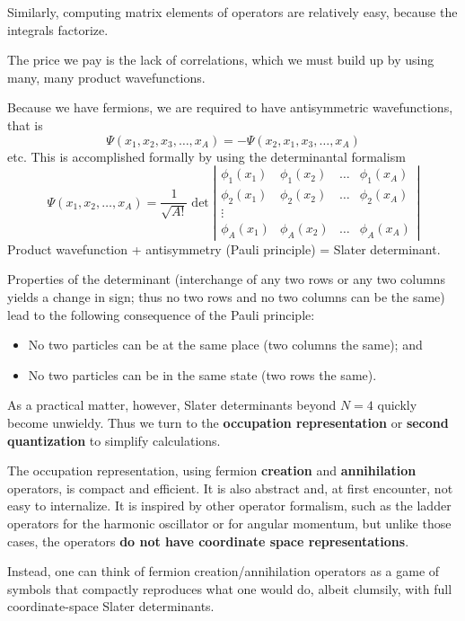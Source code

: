 \documentclass[%
twoside,                 %
final,                   %
10pt]{article}
\begin{document}
Similarly, computing matrix elements of operators are relatively easy, because the 
integrals factorize.


The price we pay is the lack of correlations, which we must build up by using many, many product 
wavefunctions.


Because we have fermions, we are required to have antisymmetric wavefunctions, that is
\[
\Psi(x_1, x_2, x_3, \ldots, x_A) = - \Psi(x_2, x_1, x_3, \ldots, x_A)
\]
etc. This is accomplished formally by using the determinantal formalism
\[
\Psi(x_1, x_2, \ldots, x_A) 
= \frac{1}{\sqrt{A!}} 
\det \left | 
\begin{array}{cccc}
\phi_1(x_1) & \phi_1(x_2) & \ldots & \phi_1(x_A) \\
\phi_2(x_1) & \phi_2(x_2) & \ldots & \phi_2(x_A) \\
 \vdots & & &  \\
\phi_A(x_1) & \phi_A(x_2) & \ldots & \phi_A(x_A) 
\end{array}
\right |
\]
Product wavefunction + antisymmetry (Pauli principle) = Slater determinant. 


Properties of the determinant (interchange of any two rows or 
any two columns yields a change in sign; thus no two rows and no 
two columns can be the same) lead to the following consequence of the Pauli principle:

\begin{itemize}
\item No two particles can be at the same place (two columns the same); and

\item No two particles can be in the same state (two rows the same).
\end{itemize}

\noindent
As a practical matter, however, Slater determinants beyond $N=4$ quickly become 
unwieldy. Thus we turn to the \textbf{occupation representation} or \textbf{second quantization} to simplify calculations. 

The occupation representation, using fermion \textbf{creation} and \textbf{annihilation} 
operators, is compact and efficient. It is also abstract and, at first encounter, not easy to 
internalize. It is inspired by other operator formalism, such as the ladder operators for 
the harmonic oscillator or for angular momentum, but unlike those cases, the operators \textbf{do not have coordinate space representations}.

Instead, one can think of fermion creation/annihilation operators as a game of symbols that 
compactly reproduces what one would do, albeit clumsily, with full coordinate-space Slater 
determinants. 
\end{document}
